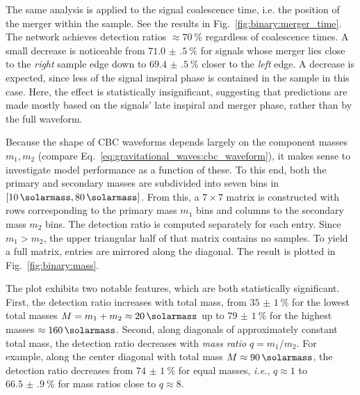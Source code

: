 
The same analysis is applied to the signal coalescence time, i.e. the position of the merger within the sample. See the results in Fig.~\ref{fig:binary:merger_time}. The network achieves detection ratios $\approx\SI{70}{\percent}$ regardless of coalescence times. A small decrease is noticeable from $\SI{71.0(5)}{\percent}$ for signals whose merger lies close to the \emph{right} sample edge down to $\SI{69.4(5)}{\percent}$ closer to the \emph{left} edge. A decrease is expected, since less of the signal inspiral phase is contained in the sample in this case. Here, the effect is statistically insignificant, suggesting that predictions are made mostly based on the signals' late inspiral and merger phase, rather than by the full waveform.


Because the shape of CBC waveforms depends largely on the component masses $m_1, m_2$ (compare Eq.~\ref{eq:gravitational_waves:cbc_waveform}), it makes sense to investigate model performance as a function of these. To this end, both the primary and secondary masses are subdivided into seven bins in $[\SI{10}{\solarmass}, \SI{80}{\solarmass}]$. From this, a $7\times7$ matrix is constructed with rows corresponding to the primary mass $m_1$ bins and columns to the secondary mass $m_2$ bins. The detection ratio is computed separately for each entry. Since $m_1>m_2$, the upper triangular half of that matrix contains no samples. To yield a full matrix, entries are mirrored along the diagonal. The result is plotted in Fig.~\ref{fig:binary:mass}.

The plot exhibits two notable features, which are both statistically significant. First, the detection ratio increases with total mass, from $\SI{35(1)}{\percent}$ for the lowest total masses $M = m_1+m_2 \approx\SI{20}{\solarmass}$ up to $\SI{79(1)}{\percent}$ for the highest masses $\approx\SI{160}{\solarmass}$. Second, along diagonals of approximately constant total mass, the detection ratio decreases with \emph{mass ratio} $q = m_1 / m_2$. For example, along the center diagonal with total mass $M \approx \SI{90}{\solarmass}$, the detection ratio decreases from $\SI{74(1)}{\percent}$ for equal masses, \emph{i.e.}, $q\approx1$ to $\SI{66.5(9)}{\percent}$ for mass ratios close to $q\approx8$.

